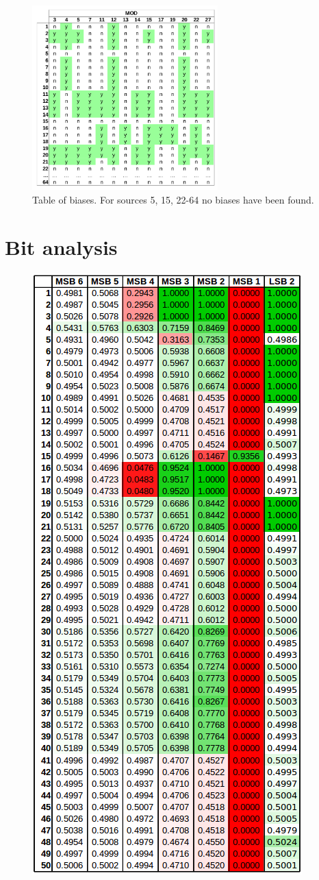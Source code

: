 \begin{figure}[ht]
\centering
\includegraphics[width=0.64\textwidth]{tex/images/mod_analysis}
\caption{Table of biases. For sources 5, 15, 22-64 no biases have been found.}
\vspace{4in}

\end{figure}

\clearpage

\section{Bit analysis}
\label{appendix-bit-analysis}

\begin{figure}[ht]
	\centering
	\includegraphics[width=0.47\linewidth]{tex/images/analysis/bit_sheet_1}
\end{figure}


